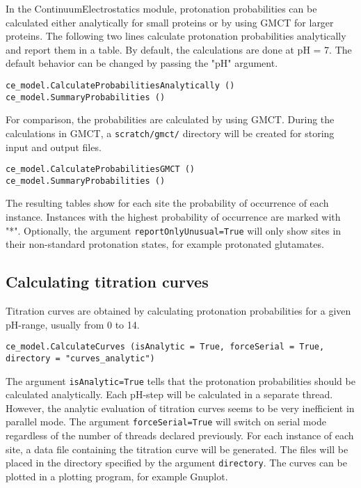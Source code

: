 \documentclass[a4paper,11pt]{article}
\newcommand{\modulename}{ContinuumElectrostatics\xspace}
\begin{document}
\bigskip
In the \modulename module, protonation probabilities can be calculated either analytically for
small proteins or by using GMCT for larger proteins.
%
The following two lines calculate protonation probabilities analytically and report them
in a table.
%
By default, the calculations are done at pH = 7.
%
The default behavior can be changed by passing the "pH" argument. 

{\footnotesize \begin{lstlisting}
ce_model.CalculateProbabilitiesAnalytically ()
ce_model.SummaryProbabilities ()
\end{lstlisting} }


\bigskip
For comparison, the probabilities are calculated by using GMCT. 
%
During the calculations in GMCT, a \texttt{scratch/gmct/} directory will be created
for storing input and output files.

{\footnotesize \begin{lstlisting}
ce_model.CalculateProbabilitiesGMCT ()
ce_model.SummaryProbabilities ()
\end{lstlisting} }

\bigskip
The resulting tables show for each site the probability of occurrence of each instance. 
%
Instances with the highest probability of occurrence are marked with "*".
%
Optionally, the argument \texttt{reportOnlyUnusual=True} will only show sites 
in their non-standard  protonation states, for example protonated glutamates.


\subsection{Calculating titration curves}
Titration curves are obtained by calculating protonation probabilities for a given pH-range, 
usually from 0 to 14.

{\footnotesize \begin{lstlisting}
ce_model.CalculateCurves (isAnalytic = True, forceSerial = True, directory = "curves_analytic")
\end{lstlisting} }

\bigskip
The argument \texttt{isAnalytic=True} tells that the protonation probabilities should be
calculated analytically.
%
Each pH-step will be calculated in a separate thread.
%
However, the analytic evaluation of titration curves seems to be very inefficient in parallel 
mode.
%
The argument \texttt{forceSerial=True} will switch on serial mode regardless of the number 
of threads declared previously.
%
For each instance of each site, a data file containing the titration curve will be generated.
%
The files will be placed in the directory specified by the argument \texttt{directory}.
%
The curves can be plotted in a plotting program, for example Gnuplot.
\end{document}
